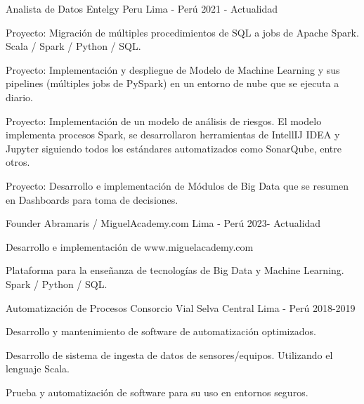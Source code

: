 

\begin{cventries}

  \cventry
  {Analista de Datos} %
  {Entelgy Peru} %
  {Lima - Per\'u} %
  {2021 - Actualidad} %
  {
    \begin{cvitems} %
      \item {Proyecto: Migraci\'on de m\'ultiples procedimientos de SQL a jobs de Apache Spark. Scala / Spark / Python / SQL.}
      \item {Proyecto: Implementaci\'on y despliegue de Modelo de Machine Learning y sus pipelines (m\'ultiples jobs de PySpark) en un entorno de nube que se ejecuta a diario.}
      \item {Proyecto: Implementaci\'on de un modelo de an\'alisis de riesgos. El modelo implementa procesos Spark, se desarrollaron herramientas de IntellIJ IDEA y Jupyter siguiendo todos los est\'andares automatizados como SonarQube, entre otros.}
      \item {Proyecto: Desarrollo e implementaci\'on de M\'odulos de Big Data que se resumen en Dashboards para toma de decisiones.}
    \end{cvitems}
  }

  \cventry
  {Founder} %
  {Abramaris / MiguelAcademy.com} %
  {Lima - Per\'u} %
  {2023- Actualidad} %
  {
    \begin{cvitems} %
      \item {Desarrollo e implementaci\'on de www.miguelacademy.com}
      \item {Plataforma para la enseñanza de tecnolog\'ias de Big Data y Machine Learning. Spark / Python / SQL.}
    \end{cvitems}
  }

  \cventry
  {Automatizaci\'on de Procesos} %
  {Consorcio Vial Selva Central} %
  {Lima - Per\'u} %
  {2018-2019} %
  {
    \begin{cvitems} %
      \item {Desarrollo y mantenimiento de software de automatizaci\'on optimizados.}
      \item {Desarrollo de sistema de ingesta de datos de sensores/equipos. Utilizando el lenguaje Scala.}
      \item {Prueba y automatizaci\'on de software para su uso en entornos seguros.}
    \end{cvitems}
  }


\end{cventries}
